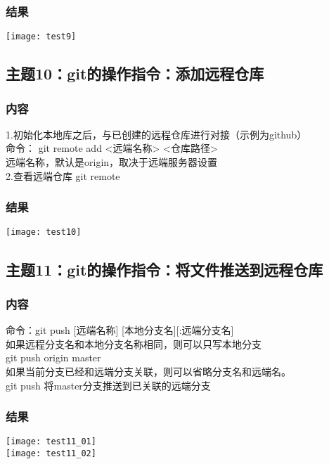 \documentclass{article}
\begin{document}
\subsubsection{结果}  
\texttt{[image: test9]}\\
\vspace{1cm}
\subsection{主题10：git的操作指令：添加远程仓库}  
\subsubsection{内容}
1.初始化本地库之后，与已创建的远程仓库进行对接（示例为github）\\
命令： git remote add <远端名称> <仓库路径>\\
远端名称，默认是origin，取决于远端服务器设置\\
2.查看远端仓库 git remote
\subsubsection{结果}  
\texttt{[image: test10]}\\
\vspace{1cm}
\subsection{主题11：git的操作指令：将文件推送到远程仓库}  
\subsubsection{内容}
命令：git push  [远端名称] [本地分支名][:远端分支名]\\
如果远程分支名和本地分支名称相同，则可以只写本地分支\\
git push origin master\\
如果当前分支已经和远端分支关联，则可以省略分支名和远端名。\\
git push 将master分支推送到已关联的远端分支\\
\subsubsection{结果}  
\texttt{[image: test11\_01]}\\
\texttt{[image: test11\_02]}\\
\vspace{1cm}
\end{document}
